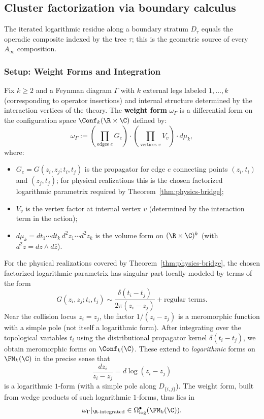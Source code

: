 \subsection{Cluster factorization via boundary calculus}
\label{sec:cluster_factorization_complete}

The iterated logarithmic residue along a boundary stratum $D_\tau$ equals the operadic composite indexed by the tree $\tau$; this is the geometric source of every $A_\infty$ composition.

\subsubsection{Setup: Weight Forms and Integration}

\begin{definition}
\label{def:weight_forms}
Fix $k \geq 2$ and a Feynman diagram $\Gamma$ with $k$ external legs labeled $1, \ldots, k$ (corresponding to operator insertions) and internal structure determined by the interaction vertices of the theory. The \textbf{weight form} $\omega_\Gamma$ is a differential form on the configuration space $\Conf_k(\R \times \C)$ defined by:
\[
\omega_\Gamma := \left(\prod_{\text{edges } e} G_e\right) \cdot \left(\prod_{\text{vertices } v} V_v\right) \cdot d\mu_k,
\]
where:
\begin{itemize}
\item $G_e = G(z_i, z_j; t_i, t_j)$ is the propagator for edge $e$ connecting points $(z_i, t_i)$ and $(z_j, t_j)$; for physical realizations this is the chosen factorized logarithmic parametrix required by Theorem~\ref{thm:physics-bridge};

\item $V_v$ is the vertex factor at internal vertex $v$ (determined by the interaction term in the action);

\item $d\mu_k = dt_1 \cdots dt_k \, d^2z_1 \cdots d^2z_k$ is the volume form on $(\R \times \C)^k$ (with $d^2z = dz \wedge d\bar{z}$).
\end{itemize}

For the physical realizations covered by Theorem~\ref{thm:physics-bridge}, the chosen factorized logarithmic parametrix has singular part locally modeled by terms of the form
\[
G(z_i, z_j; t_i, t_j) \sim \frac{\delta(t_i - t_j)}{2\pi(z_i - z_j)} + \text{regular terms}.
\]
Near the collision locus $z_i = z_j$, the factor $1/(z_i - z_j)$ is a meromorphic function with a simple pole (not itself a logarithmic form). After integrating over the topological variables $t_i$ using the distributional propagator kernel $\delta(t_i - t_j)$, we obtain meromorphic forms on $\Conf_k(\C)$. These extend to \emph{logarithmic} forms on $\FM_k(\C)$ in the precise sense that
\[
\frac{dz_i}{z_i - z_j} = d\log(z_i - z_j)
\]
is a logarithmic $1$-form (with a simple pole along $D_{\{i,j\}}$). The weight form, built from wedge products of such logarithmic $1$-forms, thus lies in
\[
\omega_\Gamma|_{\R\text{-integrated}} \in \Omega^{\bullet}_{\log}(\FM_k(\C)).
\]
\end{definition}

